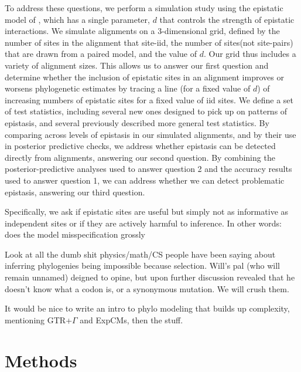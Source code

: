 \documentclass[11pt]{article}
\newcommand{\amcomment}[1]{{\color{blue}{(\textbf{AM's comment:} #1)}}}
\begin{document}
To address these questions, we perform a simulation study using the epistatic model of \cite{nasrallah2013phylogenetic}, which has a single parameter, $d$ that controls the strength of epistatic interactions.
We simulate alignments on a 3-dimensional grid, defined by the number of sites in the alignment that site-iid, the number of sites(not site-pairs) that are drawn from a paired model, and the value of $d$.
Our grid thus includes a variety of alignment sizes.
This allows us to answer our first question and determine whether the inclusion of epistatic sites in an alignment improves or worsens phylogenetic estimates by tracing a line (for a fixed value of $d$) of increasing numbers of epistatic sites for a fixed value of iid sites.
We define a set of test statistics, including several new ones designed to pick up on patterns of epistasis, and several previously described more general test statistics.
By comparing across levels of epistasis in our simulated alignments, and by their use in posterior predictive checks, we address whether epistasis can be detected directly from alignments, answering our second question.
By combining the posterior-predictive analyses used to answer question 2 and the accuracy results used to answer question 1, we can address whether we can detect problematic epistasis, answering our third question.




Specifically, we ask if epistatic sites are useful but simply not as informative as independent sites or if they are actively harmful to inference.
In other words: does the model misspecification grossly


Look at all the dumb shit physics/math/CS people have been saying about inferring phylogenies being impossible because selection.
Will's pal (who will remain unnamed) deigned to opine, but upon further discussion revealed that he doesn't know what a codon is, or a synonymous mutation.
We will crush them.

It would be nice to write an intro to phylo modeling that builds up complexity, mentioning GTR+$\Gamma$ and ExpCMs, then the \cite{nasrallah2013phylogenetic} stuff.

\section*{Methods\label{sec:methods}}
\end{document}
